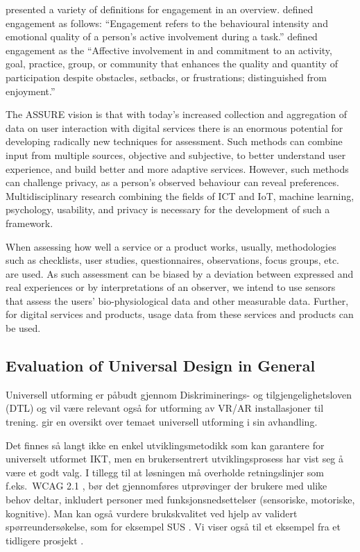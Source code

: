 \documentclass[11pt,english]{nik}
\begin{document}
\citet{martenssonPeerEngagementTeaching2016} presented a variety of definitions for engagement in an overview. 
\citet{Reeve2009} defined engagement as follows: “Engagement refers to the behavioural intensity and emotional quality of a person’s active involvement during a task.” 
\citet{lemkeDocumentingAssessingLearning2015} defined engagement as the “Affective involvement in and commitment to an activity, goal, practice, group, or community that enhances the quality and quantity of participation despite obstacles, setbacks, or frustrations; distinguished from enjoyment.”

The ASSURE vision is that with today’s increased collection and aggregation of data on user interaction with digital services there is an enormous potential for developing radically new techniques for assessment. Such methods can combine input from multiple sources, objective and subjective, to better understand user experience, and build better and more adaptive services. However, such methods can challenge privacy, as a person’s observed behaviour can reveal preferences. Multidisciplinary research combining the fields of ICT and IoT, machine learning, psychology, usability, and privacy is necessary for the development of such a framework.

When assessing how well a service or a product works, usually, methodologies such as checklists, user studies, questionnaires, observations, focus groups, etc. are used. As such assessment can be biased by a deviation between expressed and real experiences or by interpretations of an observer, we intend to use sensors that assess the users’ bio-physiological data and other measurable data. Further, for digital services and products, usage data from these services and products can be used. 


\subsection{Evaluation of Universal Design in General}

Universell utforming %
er påbudt gjennom Diskriminerings- og
tilgjengelighetsloven (DTL) \autocite{dtl-2013} og
vil være relevant også for utforming av VR/AR installasjoner til trening. 
\citet{kristins-phd} gir en oversikt over temaet universell utforming i sin avhandling.

Det finnes så langt ikke en enkel
utviklingsmetodikk som kan garantere for universelt utformet IKT,
men en brukersentrert utviklingsprosess har vist seg å være et godt
valg. 
I tillegg til at løsningen må overholde retningslinjer som f.eks.\ WCAG
2.1 \autocite{WCAG-21}, 
bør det gjennomføres utprøvinger der brukere med ulike behov
deltar, inkludert personer med funksjonsnedsettelser (sensoriske,
motoriske, kognitive).
Man kan også vurdere brukskvalitet
ved hjelp av validert spørreundersøkelse, som for eksempel
SUS \autocite{brooke-1996}. Vi viser også til et
eksempel fra et tidligere
prosjekt \autocite{schulz-gladhorn-saether-2015}.
\end{document}
